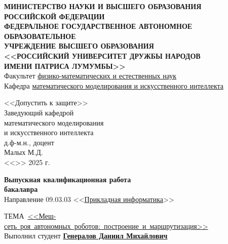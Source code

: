 \documentclass[%
]{report}
\begin{document}
\begin{titlepage}

  \begin{center}
    \hfill \break
    \small
    \textbf{
      МИНИСТЕРСТВО НАУКИ И ВЫСШЕГО ОБРАЗОВАНИЯ\\
      РОССИЙСКОЙ ФЕДЕРАЦИИ\\
      ФЕДЕРАЛЬНОЕ ГОСУДАРСТВЕННОЕ АВТОНОМНОЕ ОБРАЗОВАТЕЛЬНОЕ\\
      УЧРЕЖДЕНИЕ ВЫСШЕГО ОБРАЗОВАНИЯ\\
      <<РОССИЙСКИЙ УНИВЕРСИТЕТ ДРУЖБЫ НАРОДОВ\\
      ИМЕНИ ПАТРИСА ЛУМУМБЫ>>
    }\\
    \normalsize
    Факультет \uline{физико-математических и естественных наук}\\ 
    Кафедра \uline{математического моделирования и искусственного интеллекта}

    \vspace*{\fill}
 
    \begin{flushright}
      <<Допустить к защите>>\\
      Заведующий кафедрой\\
      математического моделирования\\и искусственного интеллекта\\
      д.ф-м.н., доцент\\
      \underline{\phantom{signature signa}} Малых М.Д.\\
      <<\underline{\phantom{day}}>> \underline{\phantom{month month}} 2025 г.
    \end{flushright}
   
    \vspace*{\fill}
    \Large{\textbf{Выпускная квалификационная работа\\ бакалавра}}
    \\
    \normalsize
    \vspace{0.5cm}
    Направление  09.03.03 <<\uline{Прикладная информатика}>>
  \end{center}

  \vspace*{\fill}

  \begin{justify}
    \mbox{ТЕМА \uline{<<Меш-сеть роя автономных роботов: построение и маршрутизация>>}} \\
    Выполнил студент \underline{\textbf{Генералов Даниил Михайлович}}
  \end{justify}
  

\end{titlepage}
\end{document}
